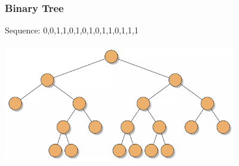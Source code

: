 \documentclass{beamer}
\begin{document}
\begin{frame}
  \frametitle{Binary Tree}
  Sequence: 0,0,1,1,0,1,0,1,0,1,1,0,1,1,1\\~\\
  
\includegraphics[width=4in]{figures/BinaryTree.png}
\end{frame}



\end{document}
